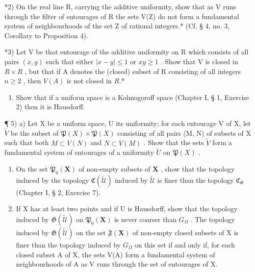 *2) On the real line R, carrying the additive uniformity, show that as V runs through the filter of entourages of R the sets V(Z) do not form a fundamental system of neighbourhoods of the set Z of rational integers.* (Cf. § 4, no. 3, Corollary to Proposition 4).

*3) Let V be that entourage of the additive uniformity on R which consists of all pairs \((x, y)\) such that either \(|x - y| \leqslant 1\) or \(xy \geqslant 1\) . Show that V is closed in \(R \times R\) , but that if A denotes the (closed) subset of R consisting of all integers \(n \geqslant 2\) , then \(V(A)\) is not closed in \(R\).*

\begin{enumerate}
\def\labelenumi{\arabic{enumi})}
\setcounter{enumi}{3}
\tightlist
\item
  Show that if a uniform space is a Kolmogoroff space (Chapter I, § 1, Exercise 2) then it is Hausdorff.
\end{enumerate}

¶ 5) a) Let X be a uniform space, U its uniformity; for each entourage V of X, let \(\tilde{V}\) be the subset of \(\mathfrak{P}(X) \times \mathfrak{P}(X)\) consisting of all pairs (M, N) of subsets of X such that both \(M \subset V(N)\) and \(N \subset V(M)\) . Show that the sets \(\tilde{V}\) form a fundamental system of entourages of a uniformity \(\tilde{U}\) on \(\mathfrak{P}(X)\) .

\begin{enumerate}
\def\labelenumi{\alph{enumi})}
\setcounter{enumi}{1}
\item
  On the set \(\mathfrak{P}_{0}(\mathbf{X})\) of non-empty subsets of \(\mathbf{X}\) , show that the topology induced by the topology \(\mathfrak{C}(\tilde{\mathcal{U}})\) induced by \(\tilde{\mathcal{U}}\) is finer than the topology \(\mathfrak{C}_{\Phi}\) (Chapter I, § 2, Exercise 7).
\item
  If X has at least two points and if U is Hausdorff, show that the topology induced by \(\mathfrak{G}(\tilde{\mathcal{U}})\) on \(\mathfrak{P}_{0}(\mathbf{X})\) is never coarser than \(G_{\Omega}\) . The topology induced by \(\mathfrak{G}(\tilde{\mathcal{U}})\) on the set \(\mathfrak{F}(\mathbf{X})\) of non-empty closed subsets of X is finer than the topology induced by \(G_{\Omega}\) on this set if and only if, for each closed subset A of X, the sets V(A) form a fundamental system of neighbourhoods of A as V runs through the set of entourages of X.
\end{enumerate}

